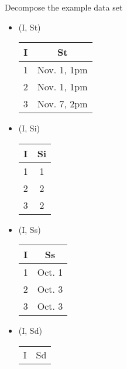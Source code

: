 \documentclass[12pt]{article}
\begin{document}
\begin{enumerate}
        Decompose the example data set
        \begin{itemize}
          \item (I, St)
                \begin{center}
                  \begin{tabular}{c c}
                    \hline
                    I & St \\
                    \hline
                    1 & Nov. 1, 1pm \\
                    2 & Nov. 1, 1pm \\
                    3 & Nov. 7, 2pm \\
                    \hline
                  \end{tabular}
                \end{center}
          \item (I, Si)
                \begin{center}
                  \begin{tabular}{c c}
                    \hline
                    I & Si \\
                    \hline
                    1 & 1  \\
                    2 & 2  \\
                    3 & 2  \\
                    \hline
                  \end{tabular}
                \end{center}
          \item (I, Ss)
                \begin{center}
                  \begin{tabular}{c c}
                    \hline
                    I & Ss \\
                    \hline
                    1 & Oct. 1  \\
                    2 & Oct. 3  \\
                    3 & Oct. 3  \\
                    \hline
                  \end{tabular}
                \end{center}
          \item (I, Sd)
                \begin{center}
                  \begin{tabular}{c c}
                    \hline
                    I & Sd \\

\end{tabular}
\end{center}
\end{itemize}
\end{enumerate}
\end{document}
